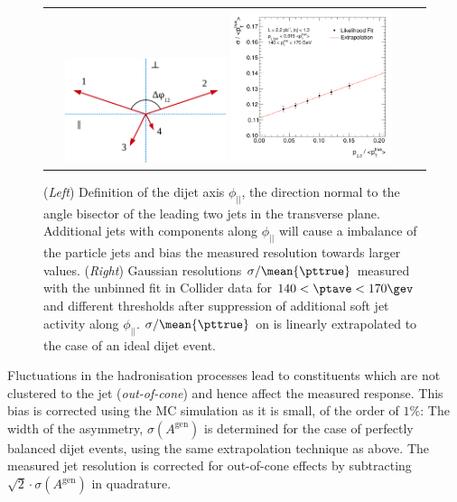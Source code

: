 \begin{figure}[ht]
  \centering
  \begin{tabular}{cc}
    \includegraphics[width=0.45\textwidth]{figures/Sketch_Projections}
    \includegraphics[width=0.45\textwidth]{figures/MaxLike_Data132440-144011_Eta00-13_ExtrapolatedPar0_PtBin4}\\
  \end{tabular}
  \caption{(\textit{Left}) Definition of the dijet axis $\phi_{||}$, the direction normal to the
    angle bisector of the leading two jets in the transverse plane.
    Additional jets with \pt components along $\phi_{||}$ will cause
    a \pt imbalance of the particle jets and bias the measured
    resolution towards larger values.
    (\textit{Right}) Gaussian resolutions \mbox{$\sigma/\mean{\pttrue}$} measured with the unbinned
    fit in Collider data for \mbox{$140 < \ptave < 170\gev$} and different 
    thresholds after suppression of additional soft jet activity along
    $\phi_{||}$. 
    \mbox{$\sigma/\mean{\pttrue}$} on  is linearly
    extrapolated to the case of an ideal dijet event.
  }
  \label{fig:qcd:resolMaxlike:biasAddJets}
\end{figure}


Fluctuations in the hadronisation processes lead to constituents which
are not clustered to the jet (\textit{out-of-cone}) and hence affect the measured response.
This bias is corrected using the MC simulation as it is small, of the
order of $1\%$:
The width of the \ptgen asymmetry, $\sigma(A^{\text{gen}})$ is determined for the
 case of perfectly balanced dijet events, using the
same extrapolation technique as above.
The measured jet \pt resolution is corrected for out-of-cone effects
by subtracting $\sqrt{2}\cdot\sigma(A^{\text{gen}})$ in quadrature.



